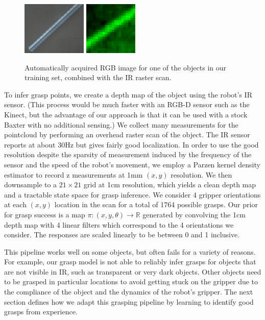 \documentclass{article}
\begin{document}
\begin{figure}
  \centering
\includegraphics[height=1in]{figures/ruler_rgb.png}
\includegraphics[height=1in]{figures/ruler_ir.png}
\caption{Automatically acquired RGB image for one of the objects in our
  training set, combined with the IR raster scan.\label{fig:ir}}
\end{figure}

To infer grasp points, we create a depth map of the object using the
robot's IR sensor.  (This process would be much faster with an RGB-D
sensor such as the Kinect, but the advantage of our approach is that
it can be used with a stock Baxter with no additional sensing.)  We
collect many measurements for the pointcloud by performing an overhead
raster scan of the object. The IR sensor reports at about 30Hz but
gives fairly good localization.  In order to use the good resolution
despite the sparsity of measurement induced by the frequency of the
sensor and the speed of the robot's movement, we employ a Parzen
kernel density estimator to record z measurements at 1mm $(x,y)$
resolution. We then downsample to a $21 \times 21$ grid at 1cm
resolution, which yields a clean depth map and a tractable state space
for grasp inference. We consider 4 gripper orientations at each
$(x,y)$ location in the scan for a total of 1764 possible grasps. Our
prior for grasp success is a map $\pi:(x,y,\theta) \rightarrow \mathbb{R}$
generated by convolving the 1cm depth map with 4 linear filters which
correspond to the 4 orientations we consider. The responses are
scaled linearly to be between 0 and 1 inclusive.

This pipeline works well on some objects, but often fails for a
variety of reasons.  For example, our grasp model is not able to 
reliably infer grasps for objects that are not visible in IR, such as
transparent or very dark objects.  Other objects need to be
grasped in particular locations to avoid getting stuck on the gripper
due to the compliance of the object and the dynamics of the robot's
gripper.  The next section defines how we adapt this grasping pipeline
by learning to identify good grasps from experience.
\end{document}
